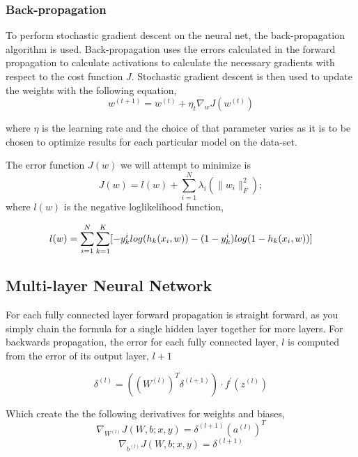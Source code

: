 \documentclass[12pt, twocolumn]{article}
\begin{document}
\subsubsection{Back-propagation}

To perform stochastic gradient descent on the neural net, the back-propagation algorithm is used. Back-propagation uses the errors calculated in the forward propagation to calculate activations to calculate the necessary gradients with respect to the cost function $J$. Stochastic gradient descent is then used to update the weights with the following equation, 
\begin{equation}
w^{(t+1)} = w^{(t)} + \eta_t \nabla_w J(w^{(t)})
\end{equation}

where $\eta$ is  the learning rate and the choice of that parameter varies as it is to be chosen to optimize results for each particular model on the data-set.

The error function $J(w)$ we will attempt to minimize is 
\begin{equation}
J(w)= l(w) + \sum_{i=1}^N\lambda_{i}(\|w_i\|_F^2);
\end{equation}
where $l(w)$ is the negative loglikelihood function,

\begin{equation}
\scriptsize
l(w)=\sum_{i=1}^N \sum_{k=1}^K [-y^i_k log(h_k(x_i,w))-(1-y^i_k)log(1-h_k(x_i,w))]
\end{equation}


\subsection{Multi-layer Neural Network}


For each fully connected layer forward propagation is straight forward, as you simply  chain the formula for a single hidden layer together for more layers.  For backwards propagation, the error for each fully connected layer, $l$ is computed from the error of its output layer, $l+1$  

\begin{equation}
\delta^{(l)}=((W^{(l)})^T \delta^{(l+1)}) \cdot f ^{\prime} (z^{(l)})
\end{equation}

Which create the the following derivatives for weights and biases, 
\begin{equation}
\nabla_{W^{(l)}}J(W,b;x,y) = \delta^{(l+1)}(a^{(l)})^T
\end{equation}
\begin{equation}
\nabla_{b^{(l)}}J(W,b;x,y)= \delta^{(l+1)}
\end{equation}
\end{document}
